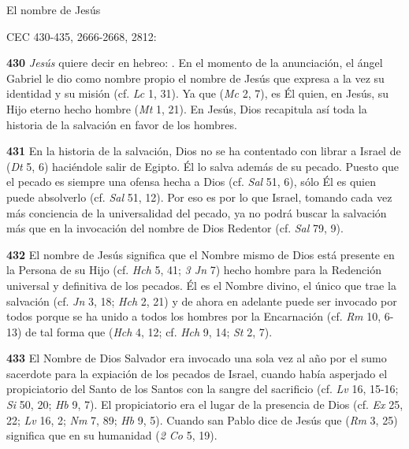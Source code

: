 \begin{body}
\begin{body}
El nombre de Jesús

CEC 430-435, 2666-2668, 2812:

\textbf{430} \emph{Jesús} quiere decir en hebreo: . En el momento de la anunciación, el ángel Gabriel le dio como nombre propio el nombre de Jesús que expresa a la vez su identidad y su misión (cf. \emph{Lc} 1, 31). Ya que  (\emph{Mc} 2, 7), es Él quien, en Jesús, su Hijo eterno hecho hombre  (\emph{Mt} 1, 21). En Jesús, Dios recapitula así toda la historia de la salvación en favor de los hombres.

\textbf{431} En la historia de la salvación, Dios no se ha contentado con librar a Israel de  (\emph{Dt} 5, 6) haciéndole salir de Egipto. Él lo salva además de su pecado. Puesto que el pecado es siempre una ofensa hecha a Dios (cf. \emph{Sal} 51, 6), sólo Él es quien puede absolverlo (cf. \emph{Sal} 51, 12). Por eso es por lo que Israel, tomando cada vez más conciencia de la universalidad del pecado, ya no podrá buscar la salvación más que en la invocación del nombre de Dios Redentor (cf. \emph{Sal} 79, 9).

\textbf{432} El nombre de Jesús significa que el Nombre mismo de Dios está presente en la Persona de su Hijo (cf. \emph{Hch} 5, 41; \emph{3 Jn} 7) hecho hombre para la Redención universal y definitiva de los pecados. Él es el Nombre divino, el único que trae la salvación (cf. \emph{Jn} 3, 18; \emph{Hch} 2, 21) y de ahora en adelante puede ser invocado por todos porque se ha unido a todos los hombres por la Encarnación (cf. \emph{Rm} 10, 6-13) de tal forma que  (\emph{Hch} 4, 12; cf. \emph{Hch} 9, 14; \emph{St} 2, 7).

\textbf{433} El Nombre de Dios Salvador era invocado una sola vez al año por el sumo sacerdote para la expiación de los pecados de Israel, cuando había asperjado el propiciatorio del Santo de los Santos con la sangre del sacrificio (cf. \emph{Lv} 16, 15-16; \emph{Si} 50, 20; \emph{Hb} 9, 7). El propiciatorio era el lugar de la presencia de Dios (cf. \emph{Ex} 25, 22; \emph{Lv} 16, 2; \emph{Nm} 7, 89; \emph{Hb} 9, 5). Cuando san Pablo dice de Jesús que  (\emph{Rm} 3, 25) significa que en su humanidad  (\emph{2 Co} 5, 19).


\end{body}
\end{body}
